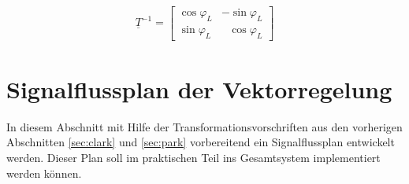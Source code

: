 \begin{align}
	\underline{T}^{-1} =
	\begin{bmatrix}
		\cos{\varphi_{L}} & -\sin{\varphi_{L}} \\
		\sin{\varphi_{L}} & ~~~\cos{\varphi_{L}}
	\end{bmatrix}
	\label{parkmatrixinvers}
\end{align}



\section{Signalflussplan der Vektorregelung}\label{sec:signalflussplan}

In diesem Abschnitt mit Hilfe der Transformationsvorschriften aus den vorherigen Abschnitten \ref{sec:clark} und \ref{sec:park} vorbereitend ein Signalflussplan entwickelt werden.
Dieser Plan soll im praktischen Teil ins Gesamtsystem implementiert werden können.




